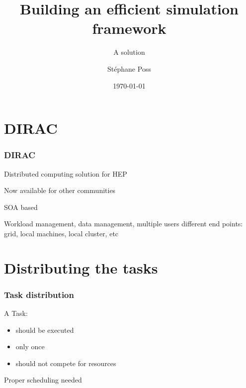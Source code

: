 \documentclass[14pt]{beamer}
\title{Building an efficient simulation framework}
\subtitle{A solution}
\author{St\'ephane Poss}
\date{\today}
\begin{document}
\begin{frame}[plain]
\titlepage
\end{frame}

\begin{frame}
\tableofcontents
\end{frame}

\section{DIRAC}
\begin{frame}
\frametitle{DIRAC}
Distributed computing solution for HEP

Now available for other communities

SOA based

Workload management, data management, multiple users
different end points: grid, local machines, local cluster, etc


\end{frame}

\section{Distributing the tasks}
\begin{frame}
\frametitle{Task distribution}
A Task:
\begin{itemize}
\item should be executed
\item only once
\item should not compete for resources
\end{itemize}
\alert{Proper scheduling needed}
\end{frame}
\end{document}
